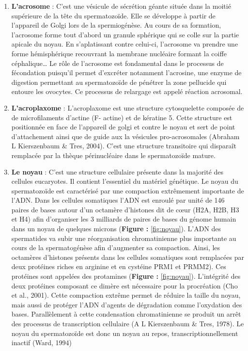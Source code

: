 \documentclass[12pt,twoside]{reedthesis}
\providecommand{\tightlist}{%
  \setlength{\itemsep}{0pt}\setlength{\parskip}{0pt}}
\theoremstyle{definition}
\theoremstyle{definition}
\theoremstyle{remark}
\begin{document}
  \begin{enumerate}
  \def\labelenumi{\arabic{enumi}.}
  \tightlist
  \item
    \textbf{L'acrosome} : C'est une vésicule de sécrétion géante située
    dans la moitié supérieure de la tête du spermatozoïde. Elle se
    développe à partir de l'appareil de Golgi lors de la spermiogénèse. Au
    cours de sa formation, l'acrosome forme tout d'abord un granule
    sphérique qui se colle sur la partie apicale du noyau. En
    s'aplatissant contre celui-ci, l'acrosome va prendre une forme
    hémisphérique recouvrant la membrane nucléaire formant la coiffe
    céphalique\ldots{} Le rôle de l'acrosome est fondamental dans le
    processus de fécondation puisqu'il permet d'excréter notamment
    l'acrosine, une enzyme de digestion permettant au spermatozoïde de
    pénétrer la zone pellucide qui entoure les ovocytes. Ce processus de
    relargage est appelé réaction acrosomal.\\
  \item
    \textbf{L'acroplaxome} : L'acroplaxome est une structure cytosquelette
    composée de de microfilaments d'actine (F- actine) et de kératine 5.
    Cette structure est positionnée en face de l'appareil de golgi et
    contre le noyau et sert de point d'attachement ainsi que de guide aux
    la vésicules pro-acrosomales (Abraham L Kierszenbaum \& Tres, 2004).
    C'est une structure transitoire qui disparaît remplacée par la thèque
    périnucléaire dans le spermatozoïde mature.\\
  \item
    \textbf{Le noyau} : C'est une structure cellulaire présente dans la
    majorité des cellules eucaryotes. Il contient l'essentiel du matériel
    génétique. Le noyau du spermatozoïde est caractérisé par une
    compaction extrêmement importante de l'ADN. Dans les cellules
    somatiques l'ADN est enroulé par unité de 146 paires de bases autour
    d'un octamère d'histones dit de cœur (H2A, H2B, H3 et H4) afin
    d'organiser les 3 milliards de paires de bases du génome humain dans
    un noyau de quelques microns (\textbf{Figure : }\ref{fig:noyau}).
    L'ADN des spermatides va subir une réorganisation chromatinienne plus
    importante au cours de la spermatogénèse afin d'augmenter sa
    compaction. Ainsi, les octamères d'histones présents dans les cellules
    somatiques sont remplacées par deux protéines riches en arginine et en
    cystéine PRM1 et PRMM2). Ces protéines sont appelées des protamines
    (\textbf{Figure : }\ref{fig:noyau}). L'intégrité des deux protéines
    composant ce dimère est nécessaire pour la procréation (Cho et al.,
    2001). Cette compaction extrême permet de réduire la taille du noyau,
    mais aussi de protéger l'ADN d'agents de dégradation comme l'oxydation
    des bases. Parallèlement à cette condensation chromatinienne se
    produit un arrêt des processus de transcription cellulaire (A L
    Kierszenbaum \& Tres, 1978). Le noyau du spermatozoïde est donc un
    noyau au repos, transcriptionnellement inactif (Ward, 1994)
  \end{enumerate}
  
\end{document}
